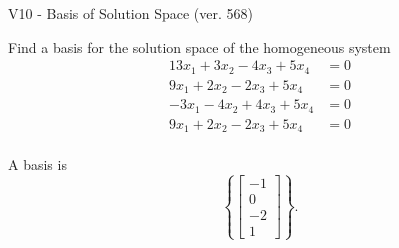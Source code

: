 \begin{exercise}
  \begin{exerciseTitle}V10 - Basis of Solution Space (ver. 568)\end{exerciseTitle}
  \begin{exerciseStatement}
    Find a basis for the solution space of the homogeneous system 
\begin{align*}
 13 x_ 1 + 3 x_ 2 -4 x_ 3 + 5 x_ 4 &= 0  \\ 
  9 x_ 1 + 2 x_ 2 -2 x_ 3 + 5 x_ 4 &= 0  \\ 
  -3 x_ 1 -4 x_ 2 + 4 x_ 3 + 5 x_ 4 &= 0  \\ 
  9 x_ 1 + 2 x_ 2 -2 x_ 3 + 5 x_ 4 &= 0  \\ 
 \end{align*}


 
  \end{exerciseStatement}

  \begin{exerciseAnswer}
   A basis is   
\[\left\{\left[\begin{array}{c}
-1 \\
0 \\
-2 \\
1
\end{array}\right]\right\}.\]

  


  \end{exerciseAnswer}
\end{exercise}